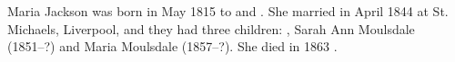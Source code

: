 
Maria Jackson was born in May 1815 to  and .
She married  in April 1844 at St. Michaels, Liverpool, and they had three children:
, Sarah Ann Moulsdale (1851--?) and Maria Moulsdale (1857--?).
She died in 1863 \cite{MariaJacksonDeath}.
